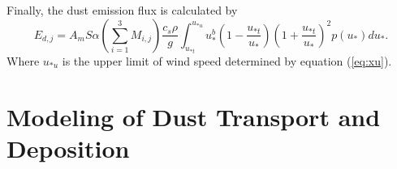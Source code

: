   Finally, the dust emission flux is calculated by
  \begin{equation} \label{eq:Edp}
  E_{d,j} = A_m S \alpha \left( \displaystyle{\sum_{i=1}^3 M_{i,j}} \right)
          \frac{c_s \rho}{g}
          \displaystyle \int_{u_{*t}}^{u_{*u}} 
          u_*^b\left(1-\frac{u_{*t}}{u_*}\right)
          \left(1+\frac{u_{*t}}{u_*}\right)^2 
          p(u_*) d u_* \mbox{.}
  \end{equation}  
  Where $u_{*u}$ is the upper limit of wind speed determined by equation (\ref{eq:xu}).
  

\section{Modeling of Dust Transport and Deposition}

